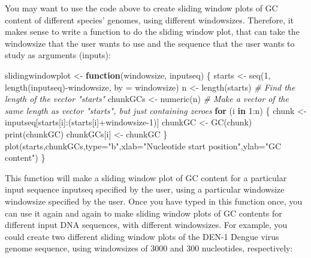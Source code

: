 \documentclass[
]{book}
\newenvironment{Shaded}{\begin{snugshade}}{\end{snugshade}}
\newcommand{\AttributeTok}[1]{\textcolor[rgb]{0.77,0.63,0.00}{#1}}
\newcommand{\CommentTok}[1]{\textcolor[rgb]{0.56,0.35,0.01}{\textit{#1}}}
\newcommand{\ControlFlowTok}[1]{\textcolor[rgb]{0.13,0.29,0.53}{\textbf{#1}}}
\newcommand{\DecValTok}[1]{\textcolor[rgb]{0.00,0.00,0.81}{#1}}
\newcommand{\FunctionTok}[1]{\textcolor[rgb]{0.00,0.00,0.00}{#1}}
\newcommand{\NormalTok}[1]{#1}
\newcommand{\OtherTok}[1]{\textcolor[rgb]{0.56,0.35,0.01}{#1}}
\newcommand{\SpecialCharTok}[1]{\textcolor[rgb]{0.00,0.00,0.00}{#1}}
\newcommand{\StringTok}[1]{\textcolor[rgb]{0.31,0.60,0.02}{#1}}
\begin{document}
You may want to use the code above to create sliding window plots of GC content of different species' genomes, using different windowsizes. Therefore, it makes sense to write a function to do the sliding window plot, that can take the windowsize that the user wants to use and the sequence that the user wants to study as arguments (inputs):

\begin{Shaded}
\begin{Highlighting}[]
\NormalTok{ slidingwindowplot }\OtherTok{\textless{}{-}} \ControlFlowTok{function}\NormalTok{(windowsize, inputseq)}
\NormalTok{\{}
\NormalTok{   starts }\OtherTok{\textless{}{-}} \FunctionTok{seq}\NormalTok{(}\DecValTok{1}\NormalTok{, }\FunctionTok{length}\NormalTok{(inputseq)}\SpecialCharTok{{-}}\NormalTok{windowsize, }\AttributeTok{by =}\NormalTok{ windowsize)}
\NormalTok{   n }\OtherTok{\textless{}{-}} \FunctionTok{length}\NormalTok{(starts)    }\CommentTok{\# Find the length of the vector "starts"}
\NormalTok{   chunkGCs }\OtherTok{\textless{}{-}} \FunctionTok{numeric}\NormalTok{(n) }\CommentTok{\# Make a vector of the same length as vector "starts", but just containing zeroes}
   \ControlFlowTok{for}\NormalTok{ (i }\ControlFlowTok{in} \DecValTok{1}\SpecialCharTok{:}\NormalTok{n) \{}
\NormalTok{        chunk }\OtherTok{\textless{}{-}}\NormalTok{ inputseq[starts[i]}\SpecialCharTok{:}\NormalTok{(starts[i]}\SpecialCharTok{+}\NormalTok{windowsize}\DecValTok{{-}1}\NormalTok{)]}
\NormalTok{        chunkGC }\OtherTok{\textless{}{-}} \FunctionTok{GC}\NormalTok{(chunk)}
        \FunctionTok{print}\NormalTok{(chunkGC)}
\NormalTok{        chunkGCs[i] }\OtherTok{\textless{}{-}}\NormalTok{ chunkGC}
\NormalTok{   \}}
   \FunctionTok{plot}\NormalTok{(starts,chunkGCs,}\AttributeTok{type=}\StringTok{"b"}\NormalTok{,}\AttributeTok{xlab=}\StringTok{"Nucleotide start position"}\NormalTok{,}\AttributeTok{ylab=}\StringTok{"GC content"}\NormalTok{)}
\NormalTok{\}}
\end{Highlighting}
\end{Shaded}

This function will make a sliding window plot of GC content for a particular input sequence inputseq specified by the user, using a particular windowsize windowsize specified by the user. Once you have typed in this function once, you can use it again and again to make sliding window plots of GC contents for different input DNA sequences, with different windowsizes. For example, you could create two different sliding window plots of the DEN-1 Dengue virus genome sequence, using windowsizes of 3000 and 300 nucleotides, respectively:
\end{document}
